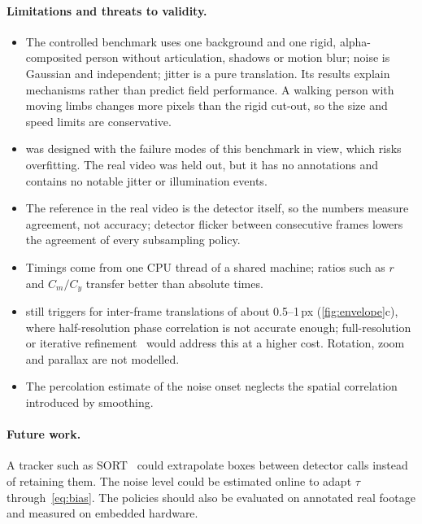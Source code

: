 \paragraph{Limitations and threats to validity.}
\begin{itemize}
\item The controlled benchmark uses one background and one rigid, alpha-composited person without articulation, shadows or motion blur; noise is Gaussian and independent; jitter is a pure translation. Its results explain mechanisms rather than predict field performance. A walking person with moving limbs changes more pixels than the rigid cut-out, so the size and speed limits are conservative.
\item \FDS{} was designed with the failure modes of this benchmark in view, which risks overfitting. The real video was held out, but it has no annotations and contains no notable jitter or illumination events.
\item The reference in the real video is the detector itself, so the numbers measure agreement, not accuracy; detector flicker between consecutive frames lowers the agreement of every subsampling policy.
\item Timings come from one CPU thread of a shared machine; ratios such as $r$ and $C_m/C_y$ transfer better than absolute times.
\item \FDS{} still triggers for inter-frame translations of about 0.5--1\,px (\cref{fig:envelope}c), where half-resolution phase correlation is not accurate enough; full-resolution or iterative refinement~\cite{lucas1981iterative,evangelidis2008ecc} would address this at a higher cost. Rotation, zoom and parallax are not modelled.
\item The percolation estimate of the noise onset neglects the spatial correlation introduced by smoothing.
\end{itemize}

\paragraph{Future work.} A tracker such as SORT~\cite{bewley2016sort} could extrapolate boxes between detector calls instead of retaining them. The noise level could be estimated online to adapt $\tau$ through~\eqref{eq:bias}. The policies should also be evaluated on annotated real footage and measured on embedded hardware.

